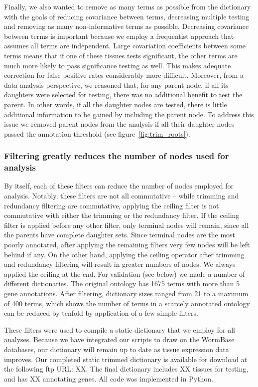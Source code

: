 \documentclass[linenumbers, doublespacing]{bmcart}
\begin{document}
	Finally, we also wanted to remove as many terms as possible from the dictionary with the goals of reducing covariance between terms, decreasing multiple testing and removing as many non-informative terms as possible. Decreasing covariance between terms is important because we employ a frequentist approach that assumes all terms are independent. Large covariation coefficients between some terms means that if one of these tissues tests significant, the other terms are much more likely to pass significance testing as well. This makes adequate correction for false positive rates considerably more difficult. Moreover, from a data analysis perspective, we reasoned that, for any parent node, if all its daughters were selected for testing, there was no additional benefit to test the parent. In other words, if all the daughter nodes are tested, there is little additional information to be gained by including the parent node.  To address this issue we removed parent nodes from the analysis if all their daughter nodes passed the annotation threshold (see figure~\ref{fig:trim_roots}). 
	
\subsubsection*{Filtering greatly reduces the number of nodes used for analysis}
	By itself, each of these filters can reduce the number of nodes employed for analysis. Notably, these filters are not all commutative -- while trimming and redundancy filtering are commutative, applying the ceiling filter is not commutative with either the trimming or the redundancy filter. If the ceiling filter is  applied before any other filter, only terminal nodes will remain, since all the parents have complete daughter sets. Since terminal nodes are the most poorly annotated, after applying the remaining filters very few nodes will be left behind if any. On the other hand, applying the ceiling operator after trimming and redundancy filtering  will result in greater numbers of nodes. We always applied the ceiling at the end. For validation (see below) we made a number of different dictionaries. The original ontology has 1675 terms with more than 5 gene annotations. After filtering, dictionary sizes ranged from 21 to a maximum of 400 terms, which shows the number of terms in a scarcely annotated ontology can be reduced by tenfold by application of a few simple filters. 
	
	These filters were used to compile a static dictionary that we employ for all analyses. Because we have integrated our scripts to draw on the WormBase databases, our dictionary will remain up to date as tissue expression data improves. Our completed static trimmed dictionary is available for download at the following ftp URL: XX. The final dictionary includes XX tissues for testing, and has XX annotating genes. All code was implemented in Python.
	
\end{document}
